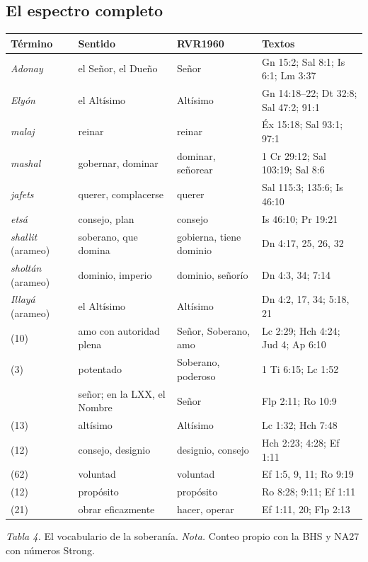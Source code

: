 \subsection{El espectro completo}
\begin{center}\small\renewcommand{\arraystretch}{1.15}
\begin{tabular}{@{}L{3.6cm}L{3.4cm}L{2.6cm}L{4.2cm}@{}}
\toprule
\textbf{Término} & \textbf{Sentido} & \textbf{RVR1960} & \textbf{Textos} \\ \midrule
{} \emph{Adonay} & el Señor, el Dueño & Señor & Gn 15:2; Sal 8:1; Is 6:1; Lm 3:37 \\
 \emph{Elyón} & el Altísimo & Altísimo & Gn 14:18--22; Dt 32:8; Sal 47:2; 91:1 \\
 \emph{malaj} & reinar & reinar & Éx 15:18; Sal 93:1; 97:1 \\
 \emph{mashal} & gobernar, dominar & dominar, señorear & 1 Cr 29:12; Sal 103:19; Sal 8:6 \\
 \emph{jafets} & querer, complacerse & querer & Sal 115:3; 135:6; Is 46:10 \\
 \emph{etsá} & consejo, plan & consejo & Is 46:10; Pr 19:21 \\ \midrule
{} \emph{shallit} (arameo) & soberano, que domina & gobierna, tiene dominio & Dn 4:17, 25, 26, 32 \\
 \emph{sholtán} (arameo) & dominio, imperio & dominio, señorío & Dn 4:3, 34; 7:14 \\
 \emph{Illayá} (arameo) & el Altísimo & Altísimo & Dn 4:2, 17, 34; 5:18, 21 \\ \midrule
{} (10) & amo con autoridad plena & Señor, Soberano, amo & Lc 2:29; Hch 4:24; Jud 4; Ap 6:10 \\
 (3) & potentado & Soberano, poderoso & 1 Ti 6:15; Lc 1:52 \\
 & señor; en la LXX, el Nombre & Señor & Flp 2:11; Ro 10:9 \\
 (13) & altísimo & Altísimo & Lc 1:32; Hch 7:48 \\
 (12) & consejo, designio & designio, consejo & Hch 2:23; 4:28; Ef 1:11 \\
 (62) & voluntad & voluntad & Ef 1:5, 9, 11; Ro 9:19 \\
 (12) & propósito & propósito & Ro 8:28; 9:11; Ef 1:11 \\
 (21) & obrar eficazmente & hacer, operar & Ef 1:11, 20; Flp 2:13 \\
\bottomrule
\end{tabular}\par
{\footnotesize\color{gris}\textit{Tabla 4.} El vocabulario de la soberanía. \textit{Nota.} Conteo propio con la BHS y NA27 con números Strong.}
\end{center}

